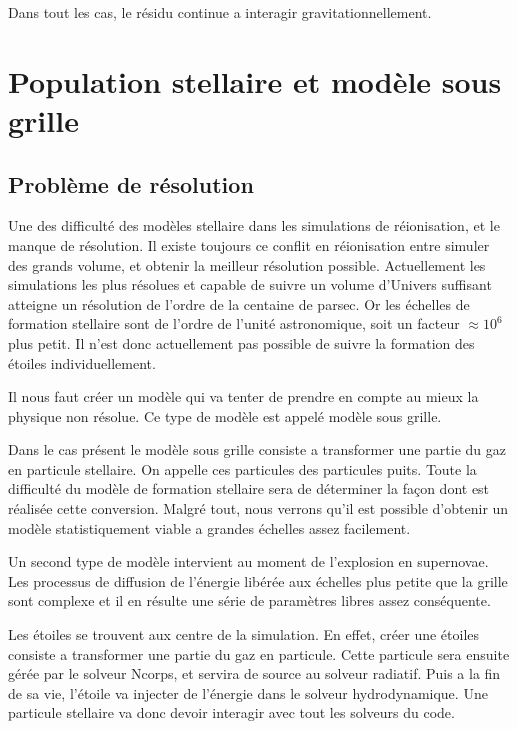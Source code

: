 Dans tout les cas, le résidu continue a interagir gravitationnellement.

\section{Population stellaire et modèle sous grille}

\subsection{Problème de résolution}



Une des difficulté des modèles stellaire dans les simulations de réionisation, et le manque de résolution.
Il existe toujours ce conflit en réionisation entre simuler des grands volume, et obtenir la meilleur résolution possible.
Actuellement les simulations les plus résolues et capable de suivre un volume d'Univers suffisant atteigne un résolution de l'ordre de la centaine de parsec.
Or les échelles de formation stellaire sont de l'ordre de l'unité astronomique, soit un facteur $\approx 10^6$ plus petit.
Il n'est donc actuellement pas possible de suivre la formation des étoiles individuellement.

Il nous faut créer un modèle qui va tenter de prendre en compte au mieux la physique non résolue.
Ce type de modèle est appelé modèle sous grille.

Dans le cas présent le modèle sous grille consiste a transformer une partie du gaz en particule stellaire.
On appelle ces particules des particules puits.
Toute la difficulté du modèle de formation stellaire sera de déterminer la façon dont est réalisée cette conversion.
Malgré tout, nous verrons qu'il est possible d'obtenir un modèle statistiquement viable a grandes échelles assez facilement.

Un second type de modèle intervient au moment de l'explosion en supernovae.
Les processus de diffusion de l'énergie libérée aux échelles plus petite que la grille sont complexe et il en résulte une série de paramètres libres assez conséquente.

Les étoiles se trouvent aux centre de la simulation.
En effet, créer une étoiles consiste a transformer une partie du gaz en particule.
Cette particule sera ensuite gérée par le solveur Ncorps, et servira de source au solveur radiatif.
Puis a la fin de sa vie, l'étoile va injecter de l'énergie dans le solveur hydrodynamique.
Une particule stellaire va donc devoir interagir avec tout les solveurs du code.




